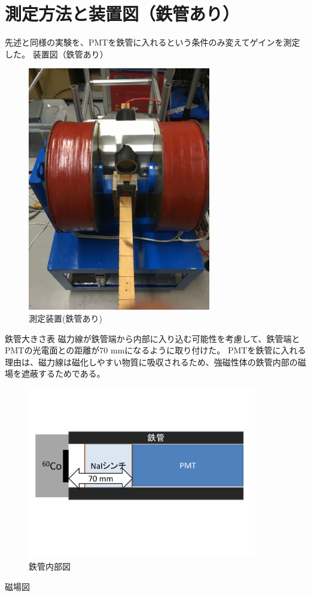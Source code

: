 \section{測定方法と装置図（鉄管あり）}
先述と同様の実験を、PMTを鉄管に入れるという条件のみ変えてゲインを測定した。
装置図（鉄管あり）
\begin{figure}[H]
	\centering
		\includegraphics[width=8cm]{fig/iguchi/2inchinFe.jpg}
	\caption{測定装置(鉄管あり)}
	\label{2inchinFe}
\end{figure}

鉄管大きさ表
磁力線が鉄管端から内部に入り込む可能性を考慮して、鉄管端とPMTの光電面との距離が70 mmになるように取り付けた。
PMTを鉄管に入れる理由は、磁力線は磁化しやすい物質に吸収されるため、強磁性体の鉄管内部の磁場を遮蔽するためである。
\begin{figure}[H]
	\centering
		\includegraphics[width=10cm]{fig/iguchi/PMTinFe.pdf}
	\caption{鉄管内部図}
	\label{PMTinFe}
\end{figure}
磁場図

